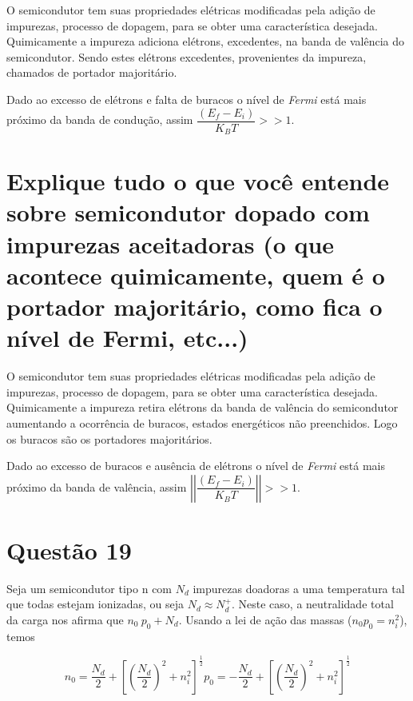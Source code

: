 O semicondutor tem suas propriedades elétricas modificadas pela adição
de impurezas,  processo de dopagem,  para se obter  uma característica
desejada. Quimicamente  a impureza  adiciona elétrons,  excedentes, na
banda de  valência do  semicondutor. Sendo estes  elétrons excedentes,
provenientes da impureza, chamados de portador majoritário.

\vspace*{0.5cm}

\noindent Dado ao excesso de elétrons e falta de buracos o nível de \emph{Fermi}
está mais próximo da banda de condução, assim $\dfrac{(E_{f} - E_{i})}{K_{B}T} >> 1$.

\section*{Explique tudo o que você entende sobre semicondutor dopado com impurezas
aceitadoras (o que acontece quimicamente, quem é o portador majoritário, como fica o
nível de Fermi, etc...)}
\label{q18}

O semicondutor tem suas propriedades elétricas modificadas pela adição
de impurezas,  processo de dopagem,  para se obter  uma característica
desejada.   Quimicamente  a  impureza  retira  elétrons  da  banda  de
valência do  semicondutor aumentando a ocorrência  de buracos, estados
energéticos  não  preenchidos.  Logo  os  buracos  são  os  portadores
majoritários.

\vspace*{0.5cm}

\noindent Dado ao excesso de buracos e ausência de elétrons o nível de
\emph{Fermi}   está  mais   próximo  da   banda  de   valência,  assim
$\left|\left|\dfrac{(E_{f} - E_{i})}{K_{B}T}\right|\right| >> 1$.

\section*{Questão 19}
\label{q19}


Seja  um semicondutor  tipo n  com  $N_{d}$ impurezas  doadoras a  uma
temperatura tal  que todas estejam  ionizadas, ou seja  $N_{d} \approx
N^{+}_{d}$. Neste caso,  a neutralidade total da carga  nos afirma que
$n_{0} ~ p_{0} + N_{d}$.  Usando a lei de ação das massas ($n_{0}p_{0}
= n^{2}_{i}$), temos

$$
n_{0} =  \dfrac{N_{d}}{2} +  \left[\left(\dfrac{N_{d}}{2}\right)^{2} +
  n_{i}^{2}\right]^{\frac{1}{2}}
p_{0} = - \dfrac{N_{d}}{2} + \left[\left(\dfrac{N_{d}}{2}\right)^{2} +
n_{i}^{2}\right]^{\frac{1}{2}}
$$

